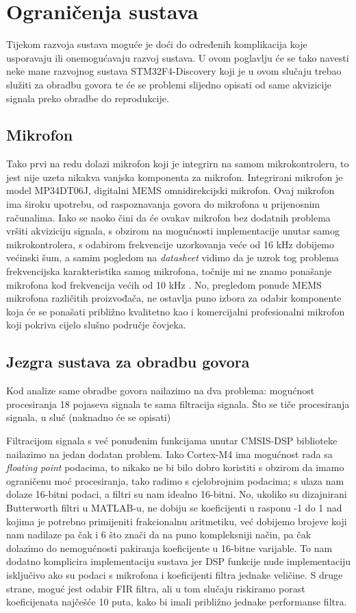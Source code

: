 \documentclass[times, utf8, diplomski]{fer}
\begin{document}
\section{Ograničenja sustava}
Tijekom razvoja sustava moguće je doći do određenih komplikacija koje usporavaju ili onemogućavaju razvoj sustava. U ovom poglavlju će se tako navesti neke mane razvojnog sustava STM32F4-Discovery koji je u ovom slučaju trebao služiti za obradbu govora te će se problemi slijedno opisati od same akvizicije signala preko obradbe do reprodukcije.

\subsection{Mikrofon}
Tako prvi na redu dolazi mikrofon koji je integrirn na samom mikrokontroleru, to jest nije uzeta nikakva vanjska komponenta za mikrofon. Integrirani mikrofon je model MP34DT06J, digitalni MEMS omnidirekcijski mikrofon. Ovaj mikrofon ima široku upotrebu, od raspoznavanja govora do mikrofona u prijenosnim računalima. Iako se naoko čini da će ovakav mikrofon bez dodatnih problema vršiti akviziciju signala, s obzirom na mogućnosti implementacije unutar samog mikrokontrolera, s odabirom frekvencije uzorkovanja veće od 16 kHz dobijemo većinski šum, a samim pogledom na \textit{datasheet} vidimo da je uzrok tog problema frekvencijska karakteristika samog mikrofona, točnije mi ne znamo ponašanje mikrofona kod frekvencija većih od 10 kHz \citep{mic}. No, pregledom ponude MEMS mikrofona različitih proizvođača, ne ostavlja puno izbora za odabir komponente koja će se ponašati približno kvalitetno kao i komercijalni profesionalni mikrofon koji pokriva cijelo slušno područje čovjeka.

\subsection{Jezgra sustava za obradbu govora}
Kod analize same obradbe govora nailazimo na dva problema: mogućnost procesiranja 18 pojaseva signala te sama filtracija signala. Što se tiče procesiranja signala, u sluč (naknadno će se opisati)

Filtracijom signala s već ponuđenim funkcijama unutar CMSIS-DSP biblioteke nailazimo na jedan dodatan problem. Iako Cortex-M4 ima mogućnost rada sa \textit{floating point} podacima, to nikako ne bi bilo dobro koristiti s obzirom da imamo ograničenu moć procesiranja, tako radimo s cjelobrojnim podacima; s ulaza nam dolaze 16-bitni podaci, a filtri su nam idealno 16-bitni. No, ukoliko su dizajnirani Butterworth filtri u MATLAB-u, ne dobiju se koeficijenti u rasponu -1 do 1 nad kojima je potrebno primijeniti frakcionalnu aritmetiku, već dobijemo brojeve koji nam nadilaze pa čak i 6 što znači da na puno kompleksniji način, pa čak dolazimo do nemogućnosti pakiranja koeficijente u 16-bitne varijable. To nam dodatno komplicira implementaciju sustava jer DSP funkcije nude implementaciju isključivo ako su podaci s mikrofona i koeficijenti filtra jednake veličine. S druge strane, moguć jest odabir FIR filtra, ali u tom slučaju riskiramo porast koeficijenata najčešće 10 puta, kako bi imali približno jednake performanse filtra.
\end{document}
